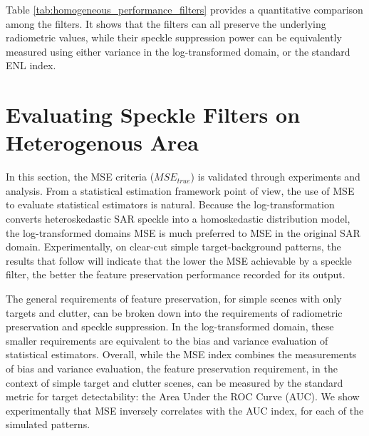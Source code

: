 \documentclass[journal]{IEEEtran}
\begin{document}
Table \ref{tab:homogeneous_performance_filters} provides a quantitative comparison among the filters.
It shows that the filters can all preserve the underlying radiometric values, while their speckle suppression power can be equivalently measured using either variance in the log-transformed domain, or the standard ENL index.

\section{Evaluating Speckle Filters on Heterogenous Area}
\label{sec:eval_hetero}


In this section, the MSE criteria ($MSE_{true}$) is validated through experiments and analysis. 
From a statistical estimation framework point of view, the use of MSE to evaluate statistical estimators is natural.
Because the log-transformation converts heteroskedastic SAR speckle into a homoskedastic distribution model, 
	the log-transformed domains MSE is much preferred to MSE in the original SAR domain.
Experimentally, on clear-cut simple target-background patterns, the results that follow will indicate that
	the lower the MSE achievable by a speckle filter,
	the better the feature preservation performance recorded for its output.

The general requirements of feature preservation, for simple scenes with only targets and clutter, can be broken 
down into the requirements of radiometric preservation and speckle suppression.
In the log-transformed domain, these smaller requirements are equivalent to the bias and variance evaluation of 
statistical estimators.
Overall, while the MSE index combines the measurements of bias and variance evaluation, 
	the feature preservation requirement, in the context of simple target and clutter scenes, can be measured by 
	the standard metric for target detectability: the Area Under the ROC Curve (AUC).
We show experimentally that MSE inversely correlates with the AUC index, for each of the simulated patterns.
\end{document}
